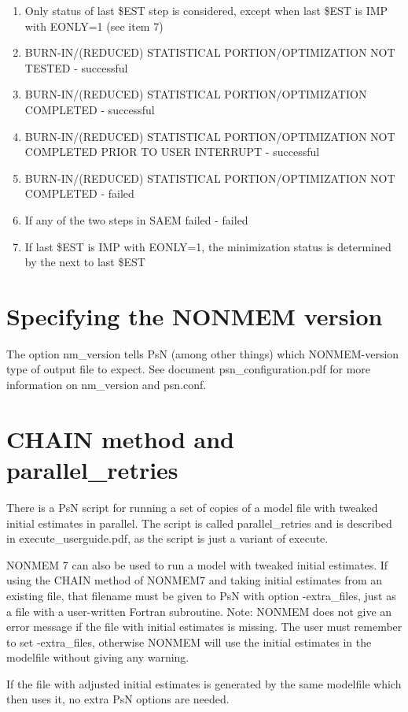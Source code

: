 \begin{enumerate}
\item Only status of last \$EST step is considered, except when last \$EST is IMP with EONLY=1 (see item 7)
\item BURN-IN/(REDUCED) STATISTICAL PORTION/OPTIMIZATION NOT TESTED - successful
\item BURN-IN/(REDUCED) STATISTICAL PORTION/OPTIMIZATION COMPLETED - successful
\item BURN-IN/(REDUCED) STATISTICAL PORTION/OPTIMIZATION NOT COMPLETED PRIOR TO USER INTERRUPT - successful
\item BURN-IN/(REDUCED) STATISTICAL PORTION/OPTIMIZATION NOT COMPLETED - failed
\item If any of the two steps in SAEM failed - failed 
\item If last \$EST is IMP with EONLY=1, the minimization status is determined by the next to last \$EST
\end{enumerate}

\section{Specifying the NONMEM version}

The option nm\_version tells PsN (among other things) which NONMEM-version type of output file to expect. See document psn\_configuration.pdf for more information on nm\_version and psn.conf.

\section{CHAIN method and parallel\_retries}

There is a PsN script for running a set of copies of a model file with tweaked initial estimates in parallel. The script is called parallel\_retries and is described in execute\_userguide.pdf, as the script is just a variant of execute.

NONMEM 7 can also be used to run a model with tweaked initial estimates. If using the CHAIN method of NONMEM7 and taking initial estimates from an existing file, that filename must be given to PsN with option -extra\_files, just as a file with a user-written Fortran subroutine. Note: NONMEM does not give an error message if the file with initial estimates is missing. The user must remember to set -extra\_files, otherwise NONMEM will use the initial estimates in the modelfile without giving any warning.

If the file with adjusted initial estimates is generated by the same modelfile which then uses it, no extra PsN options are needed.

